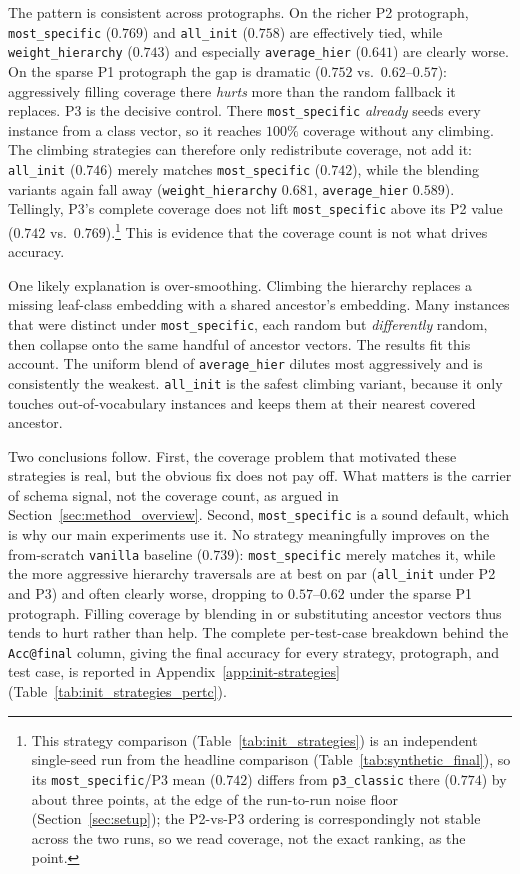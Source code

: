 \documentclass[a4paper,oneside,bibliography=totoc]{scrbook}
\begin{document}
The pattern is consistent across protographs. On the richer P2 protograph,
\texttt{most\_specific} ($0.769$) and \texttt{all\_init} ($0.758$) are
effectively tied, while \texttt{weight\_hierarchy} ($0.743$) and especially
\texttt{average\_hier} ($0.641$) are clearly worse. On the sparse P1 protograph
the gap is dramatic ($0.752$ vs.\ $0.62$--$0.57$): aggressively filling coverage
there \emph{hurts} more than the random fallback it replaces. P3 is the decisive
control. There \texttt{most\_specific} \emph{already} seeds every instance from a
class vector, so it reaches $100\%$ coverage without any climbing. The climbing
strategies can therefore only redistribute coverage, not add it:
\texttt{all\_init} ($0.746$) merely matches \texttt{most\_specific} ($0.742$),
while the blending variants again fall away (\texttt{weight\_hierarchy} $0.681$,
\texttt{average\_hier} $0.589$). Tellingly, P3's complete coverage does not lift
\texttt{most\_specific} above its P2 value ($0.742$ vs.\ $0.769$).\footnote{This
strategy comparison (Table~\ref{tab:init_strategies}) is an independent
single-seed run from the headline comparison (Table~\ref{tab:synthetic_final}),
so its \texttt{most\_specific}/P3 mean ($0.742$) differs from
\texttt{p3\_classic} there ($0.774$) by about three points, at the edge of the
run-to-run noise floor (Section~\ref{sec:setup}); the P2-vs-P3 ordering is
correspondingly not stable across the two runs, so we read coverage, not the
exact ranking, as the point.} This is evidence that the coverage count is not
what drives accuracy.

One likely explanation is over-smoothing. Climbing the hierarchy replaces a
missing leaf-class embedding with a shared ancestor's embedding. Many instances
that were distinct under \texttt{most\_specific}, each random but
\emph{differently} random, then collapse onto the same handful of ancestor
vectors. The results fit this account. The uniform blend of
\texttt{average\_hier} dilutes most aggressively and is consistently the weakest.
\texttt{all\_init} is the safest climbing variant, because it only touches
out-of-vocabulary instances and keeps them at their nearest covered ancestor.

Two conclusions follow. First, the coverage problem that motivated these
strategies is real, but the obvious fix does not pay off. What matters is the
carrier of schema signal, not the coverage count, as argued in
Section~\ref{sec:method_overview}. Second, \texttt{most\_specific} is a sound
default, which is why our main experiments use it. No strategy meaningfully
improves on the from-scratch \texttt{vanilla} baseline ($0.739$):
\texttt{most\_specific} merely matches it, while the more aggressive hierarchy
traversals are at best on par (\texttt{all\_init} under P2 and P3) and often
clearly worse, dropping to $0.57$--$0.62$ under the sparse P1 protograph. Filling
coverage by blending in or substituting ancestor vectors thus tends to hurt
rather than help. The complete per-test-case breakdown behind the
\texttt{Acc@final} column, giving the final accuracy for every strategy,
protograph, and test case, is reported in Appendix~\ref{app:init-strategies}
(Table~\ref{tab:init_strategies_pertc}).
\end{document}
